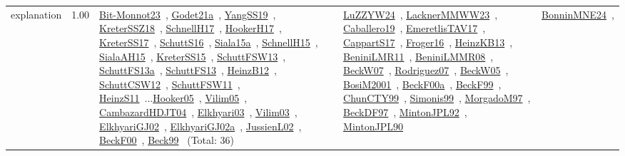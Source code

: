 {\begin{longtable}{p{3cm}r>{\raggedright\arraybackslash}p{6cm}>{\raggedright\arraybackslash}p{6cm}>{\raggedright\arraybackslash}p{8cm}}
\index{explanation}\index{Concepts!explanation}explanation &  1.00 & \href{../works/Bit-Monnot23.pdf}{Bit-Monnot23}~\cite{Bit-Monnot23}, \href{../works/Godet21a.pdf}{Godet21a}~\cite{Godet21a}, \href{../works/YangSS19.pdf}{YangSS19}~\cite{YangSS19}, \href{../works/KreterSSZ18.pdf}{KreterSSZ18}~\cite{KreterSSZ18}, \href{../works/SchnellH17.pdf}{SchnellH17}~\cite{SchnellH17}, \href{../works/HookerH17.pdf}{HookerH17}~\cite{HookerH17}, \href{../works/KreterSS17.pdf}{KreterSS17}~\cite{KreterSS17}, \href{../works/SchuttS16.pdf}{SchuttS16}~\cite{SchuttS16}, \href{../works/Siala15a.pdf}{Siala15a}~\cite{Siala15a}, \href{../works/SchnellH15.pdf}{SchnellH15}~\cite{SchnellH15}, \href{../works/SialaAH15.pdf}{SialaAH15}~\cite{SialaAH15}, \href{../works/KreterSS15.pdf}{KreterSS15}~\cite{KreterSS15}, \href{../works/SchuttFSW13.pdf}{SchuttFSW13}~\cite{SchuttFSW13}, \href{../works/SchuttFS13a.pdf}{SchuttFS13a}~\cite{SchuttFS13a}, \href{../works/SchuttFS13.pdf}{SchuttFS13}~\cite{SchuttFS13}, \href{../works/HeinzB12.pdf}{HeinzB12}~\cite{HeinzB12}, \href{../works/SchuttCSW12.pdf}{SchuttCSW12}~\cite{SchuttCSW12}, \href{../works/SchuttFSW11.pdf}{SchuttFSW11}~\cite{SchuttFSW11}, \href{../works/HeinzS11.pdf}{HeinzS11}~\cite{HeinzS11}...\href{../works/Hooker05.pdf}{Hooker05}~\cite{Hooker05}, \href{../works/Vilim05.pdf}{Vilim05}~\cite{Vilim05}, \href{../works/CambazardHDJT04.pdf}{CambazardHDJT04}~\cite{CambazardHDJT04}, \href{../works/Elkhyari03.pdf}{Elkhyari03}~\cite{Elkhyari03}, \href{../works/Vilim03.pdf}{Vilim03}~\cite{Vilim03}, \href{../works/ElkhyariGJ02.pdf}{ElkhyariGJ02}~\cite{ElkhyariGJ02}, \href{../works/ElkhyariGJ02a.pdf}{ElkhyariGJ02a}~\cite{ElkhyariGJ02a}, \href{../works/JussienL02.pdf}{JussienL02}~\cite{JussienL02}, \href{../works/BeckF00.pdf}{BeckF00}~\cite{BeckF00}, \href{../works/Beck99.pdf}{Beck99}~\cite{Beck99} (Total: 36) & \href{../works/LuZZYW24.pdf}{LuZZYW24}~\cite{LuZZYW24}, \href{../works/LacknerMMWW23.pdf}{LacknerMMWW23}~\cite{LacknerMMWW23}, \href{../works/Caballero19.pdf}{Caballero19}~\cite{Caballero19}, \href{../works/EmeretlisTAV17.pdf}{EmeretlisTAV17}~\cite{EmeretlisTAV17}, \href{../works/CappartS17.pdf}{CappartS17}~\cite{CappartS17}, \href{../works/Froger16.pdf}{Froger16}~\cite{Froger16}, \href{../works/HeinzKB13.pdf}{HeinzKB13}~\cite{HeinzKB13}, \href{../works/BeniniLMR11.pdf}{BeniniLMR11}~\cite{BeniniLMR11}, \href{../works/BeniniLMMR08.pdf}{BeniniLMMR08}~\cite{BeniniLMMR08}, \href{../works/BeckW07.pdf}{BeckW07}~\cite{BeckW07}, \href{../works/Rodriguez07.pdf}{Rodriguez07}~\cite{Rodriguez07}, \href{../works/BeckW05.pdf}{BeckW05}~\cite{BeckW05}, \href{../works/BosiM2001.pdf}{BosiM2001}~\cite{BosiM2001}, \href{../works/BeckF00a.pdf}{BeckF00a}~\cite{BeckF00a}, \href{../works/BeckF99.pdf}{BeckF99}~\cite{BeckF99}, \href{../works/ChunCTY99.pdf}{ChunCTY99}~\cite{ChunCTY99}, \href{../works/Simonis99.pdf}{Simonis99}~\cite{Simonis99}, \href{../works/MorgadoM97.pdf}{MorgadoM97}~\cite{MorgadoM97}, \href{../works/BeckDF97.pdf}{BeckDF97}~\cite{BeckDF97}, \href{../works/MintonJPL92.pdf}{MintonJPL92}~\cite{MintonJPL92}, \href{../works/MintonJPL90.pdf}{MintonJPL90}~\cite{MintonJPL90} & \href{../works/BonninMNE24.pdf}{BonninMNE24}~\cite{BonninMNE24}, 
\end{longtable}}
